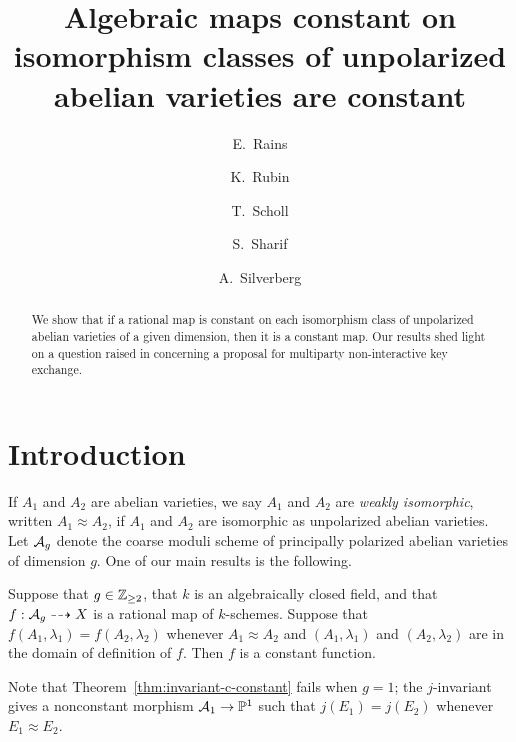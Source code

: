 \documentclass{amsart}
\title[Algebraic maps constant on unpolarized isomorphism classes]{Algebraic maps constant on isomorphism classes of unpolarized abelian varieties are constant}
\author[E.\ Rains]{E.\ Rains}
\author[K.\ Rubin]{K.\ Rubin}
\author[T.\ Scholl]{T.\ Scholl}
\author[S.\ Sharif]{S.\ Sharif}
\author[A.\ Silverberg]{A.\ Silverberg}
\begin{document}
\begin{abstract}
We show that if a %
rational map is constant on each isomorphism class of unpolarized abelian varieties of a given dimension, then it is a constant map.
Our results shed light on a question raised in \cite{multiparty} concerning a proposal for multiparty non-interactive key exchange.
\end{abstract}


\maketitle



\section{Introduction}
\label{sec:introduction}

If $A_1$ and $A_2$ are abelian varieties, we say $A_1$ and $A_2$ are \emph{weakly isomorphic}, written $A_1 \approx A_2$, if $A_1$ and $A_2$ are isomorphic as unpolarized abelian varieties. Let $\mathcal{A}_g$ denote the coarse moduli scheme of principally polarized abelian varieties of dimension $g$. One of our main results is the following.
\begin{theorem}\label{thm:invariant-c-constant}
  Suppose that $g\in\mathbb{Z}_{\ge 2}$, that $k$ is an algebraically closed field, and that $f: \mathcal{A}_g \dashrightarrow X$ is a rational map of $k$-schemes. Suppose that $f(A_1,\lambda_1) = f(A_2,\lambda_2)$ whenever $A_1 \approx A_2$ and $(A_1,\lambda_1)$ and $(A_2,\lambda_2)$ are in the domain of definition of $f$. Then $f$ is a constant function.
\end{theorem}
Note that Theorem~\ref{thm:invariant-c-constant} fails when $g = 1$; the $j$-invariant gives a nonconstant morphism $\mathcal{A}_1 \to \mathbb{P}^1$ such that $j(E_1) = j(E_2)$ whenever $E_1 \approx E_2$.



\end{document}
